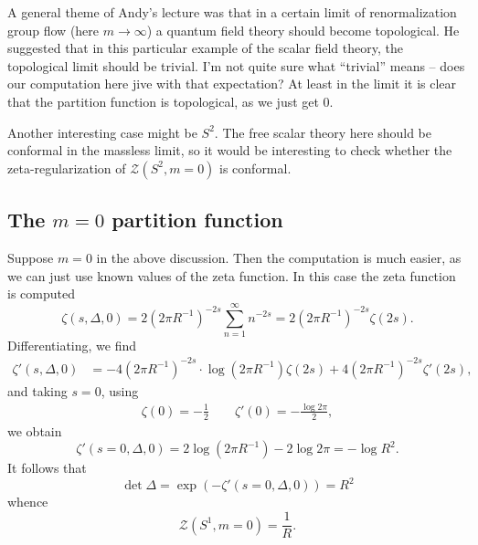 \documentclass{amsart}
\begin{document}
A general theme of Andy's lecture was that in a certain limit of renormalization
group flow (here $m\to\infty$) a quantum field theory should become topological.
He suggested that in this particular example of the scalar field theory, the topological
limit should be trivial. I'm not quite sure what ``trivial'' means -- does our
computation here jive with that expectation? At least in the limit it is clear
that the partition function is topological, as we just get 0.

Another interesting case might be $S^2$. The free scalar theory here should be conformal
in the massless limit, so it would be interesting to check whether the zeta-regularization of
$\mathcal{Z}(S^2,m=0)$ is conformal.

\subsection{The $m=0$ partition function}

Suppose $m=0$ in the above discussion. Then the computation is much easier, as we can
just use known values of the zeta function. In this case the zeta function is computed
\begin{equation*}
    \zeta(s,\Delta,0) = 2(2\pi R^{-1})^{-2s}\sum_{n=1}^\infty n^{-2s} = 2(2\pi R^{-1})^{-2s}\zeta(2s).
\end{equation*}
Differentiating, we find
\begin{align*}
    \zeta'(s,\Delta,0) &= -4(2\pi R^{-1})^{-2s}\cdot\log(2\pi R^{-1})\zeta(2s)
    + 4(2\pi R^{-1})^{-2s}\zeta'(2s),
\end{align*}
and taking $s=0$, using
\begin{align*}
    \zeta(0) = -\frac{1}{2} \qquad \zeta'(0) = -\frac{\log 2\pi}{2},
\end{align*}
we obtain
\begin{equation*}
    \zeta'(s=0,\Delta,0) = 2\log(2\pi R^{-1}) - 2 \log 2\pi = -\log R^2.
\end{equation*}
It follows that
\begin{equation*}
    \det \Delta = \exp(-\zeta'(s=0,\Delta,0)) = R^2
\end{equation*}
whence
\begin{equation*}
    \mathcal{Z}(S^1,m=0) = \frac{1}{R}.
\end{equation*}




\end{document}
